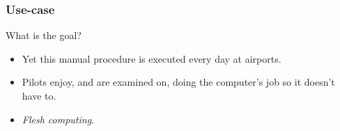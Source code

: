 \begin{frame}[fragile]
\frametitle{Use-case}
\begin{block}{What is the goal?}
\begin{itemize}
\item<1-> Yet this manual procedure is executed every day at airports.
\item<2-> Pilots enjoy, and are examined on, doing the computer's job so it doesn't have to.
\item<3-> \emph{Flesh computing}.
\end{itemize}
\end{block}
\end{frame}
